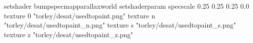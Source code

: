 setshader bumpspecmapparallaxworld
setshaderparam specscale 0.25 0.25 0.25 0.0
texture 0 "torley/desat/usedtopaint.png"
texture n "torley/desat/usedtopaint_n.png"
texture s "torley/desat/usedtopaint_s.png"
texture z "torley/desat/usedtopaint_z.png"

